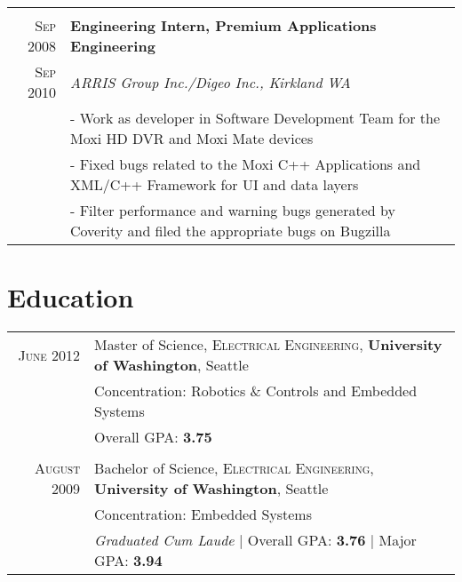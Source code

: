 \documentclass[letter,10pt]{article}
\begin{document}
\begin{tabular}{r|p{16cm}}
\multicolumn{2}{c}{} \\


\textsc{Sep 2008} & \textbf{Engineering Intern, Premium Applications Engineering}\\
\textsc{Sep 2010}&\emph{ARRIS Group Inc./Digeo Inc., Kirkland WA}\\
&\footnotesize{
 - Work as developer in Software Development Team for the Moxi HD DVR and Moxi Mate devices
}\\
&\footnotesize{
 - Fixed bugs related to the Moxi C++ Applications and XML/C++ Framework for UI and data layers
}\\
&\footnotesize{
 - Filter performance and warning bugs generated by Coverity and filed the appropriate bugs on Bugzilla
}\\

\end{tabular}

\section{Education}
\begin{tabular}{rl}	
 \textsc{June} 2012 & Master of Science, \textsc{Electrical Engineering}, \textbf{University of Washington}, Seattle\\
&\normalsize {Concentration}: Robotics \& Controls and Embedded Systems \\
& \small Overall GPA: \normalsize\textbf{3.75} \\
&\\

\textsc{August} 2009 & Bachelor of Science, \textsc{Electrical Engineering}, \textbf{University of Washington}, Seattle \\
&\normalsize {Concentration}: Embedded Systems \\
& \small\emph{Graduated Cum Laude} | Overall GPA: \normalsize\textbf{3.76} \small | Major GPA: \normalsize\textbf{3.94} \\

\end{tabular}
\end{document}
